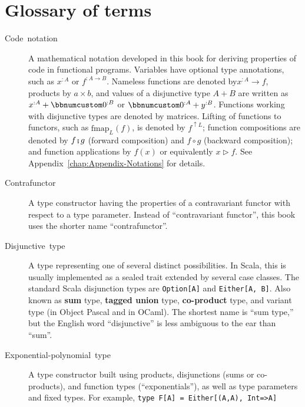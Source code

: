 \chapter{Glossary of terms\label{chap:Appendix-Glossary-of-terms}}
\begin{description}
\item [{Code~notation}] A mathematical notation
developed in this book for deriving properties of code in functional
programs. Variables have optional type annotations, such as $x^{:A}$
or $f^{:A\rightarrow B}$. Nameless functions are denoted by$x^{:A}\rightarrow f$,
products by $a\times b$, and values of a disjunctive type $A+B$
are written as $x^{:A}+\bbnum 0^{:B}$ or $\bbnum 0^{:A}+y^{:B}$.
Functions working with disjunctive types are denoted by matrices.
Lifting of functions to functors, such as $\text{fmap}_{L}(f)$, is
denoted by $f^{\uparrow L}$; function compositions are denoted by
$f\bef g$ (forward composition) and $f\circ g$ (backward composition);
and function applications by $f(x)$ or equivalently $x\triangleright f$.
See Appendix~\ref{chap:Appendix-Notations} for details.
\item [{Contrafunctor}] A type constructor having
the properties of a contravariant functor with
respect to a type parameter. Instead of \textsf{``}contravariant functor\textsf{''},
this book uses the shorter name \textsf{``}contrafunctor\textsf{''}.
\item [{Disjunctive~type}] A type representing
one of several distinct possibilities. In Scala, this is usually implemented
as a sealed trait extended by several case classes. The standard Scala
disjunction types are \lstinline!Option[A]! and \lstinline!Either[A, B]!.
Also known as \textbf{sum
}type, \textbf{tagged union}
type, \textbf{co-product}
type, and variant type (in Object Pascal and in OCaml). The shortest
name is \textsf{``}sum type,\textsf{''} but the English word \textsf{``}disjunctive\textsf{''} is
less ambiguous to the ear than \textsf{``}sum\textsf{''}.
\item [{Exponential-polynomial~type}] A
type constructor built using products, disjunctions (sums or co-products),
and function types (\textsf{``}exponentials\textsf{''}), as well as type parameters
and fixed types. For example,  \lstinline!type F[A] = Either[(A,A), Int=>A]!

\end{description}
